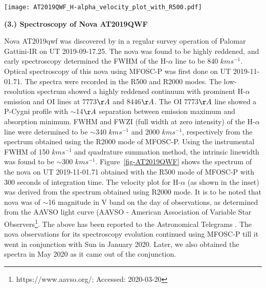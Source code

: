 \begin{figure*}
	\centering	
	\texttt{[image: AT2019QWF\_H-alpha\_velocity\_plot\_with\_R500.pdf]}
	\vspace{0.2cm}
	\caption{Low resolution spectrum of Nova AT2019QWF as recorded with MFOSC-P. R500 grating mode was used with integration time of 300 seconds. The nova was $\sim$16 magnitude in V band. Inset: Velocity plot showing H-$\alpha$ profile of Nova AT2019QWF. This was observed with R2000 mode of MFOSC-P.}
	\label{fig-AT2019QWF}
\end{figure*}

\par
{\bf (3.) Spectroscopy of Nova AT2019QWF}\\ 
\par 
Nova AT2019qwf was discovered by \cite{De2019} in a regular survey operation of Palomar Gattini-IR \citep{Moore2019} on UT 2019-09-17.25. The nova was found to be highly reddened, and early spectroscopy \citep{Lee2019} determined the FWHM of the H-$\alpha$ line to be 840 $kms^{-1}$. Optical spectroscopy of this nova using MFOSC-P was first done on UT 2019-11-01.71. The spectra were recorded in the R500 and R2000 modes. The low-resolution spectrum showed a highly reddened continuum with prominent H-$\alpha$ emission and OI lines at 7773$\AA$ and 8446$\AA$. The OI 7773$\AA$ line showed a P-Cygni profile with $\sim$14$\AA$ separation between emission maximum and absorption minimum. FWHM and FWZI (full width at zero intensity) of the H-$\alpha$ line were determined to be $\sim$340 $kms^{-1}$ and 2000 $kms^{-1}$, respectively from the spectrum obtained using the R2000 mode of MFOSC-P. Using the instrumental FWHM of 150 $kms^{-1}$ and quadrature summation method, the intrinsic linewidth was found to be $\sim$300 $kms^{-1}$. Figure~\ref{fig-AT2019QWF} shows the spectrum of the nova on UT 2019-11-01.71 obtained with the R500 mode of MFOSC-P with 300 seconds of integration time.  The velocity plot for H-$\alpha$ (as shown in the inset) was derived from the spectrum obtained using R2000 mode. It is to be noted that nova was of $\sim$16 magnitude in V band on the day of observations, as determined from the AAVSO light curve (AAVSO - American Association of Variable Star Observers\footnote{https://www.aavso.org/; Accessed: 2020-03-20}. The above has been reported to the Astronomical Telegrams \citep{Srivastava2019}.  The nova observations for its spectroscopy evolution continued using MFOSC-P till it went in conjunction with Sun in January 2020. Later, we also obtained the spectra in May 2020 as it came out of the conjunction.  



